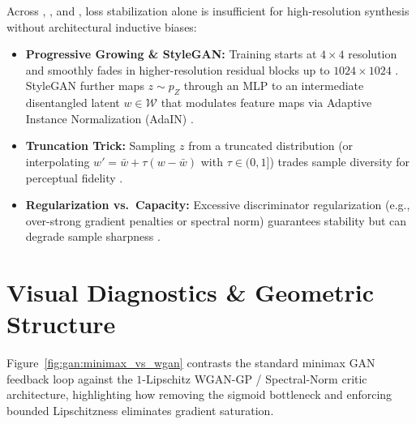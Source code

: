 \documentclass[../../../../master.tex]{subfiles}
\begin{document}
\begin{crossbook}
Across , , and , loss stabilization alone is insufficient for high-resolution synthesis without architectural inductive biases:
\begin{itemize}
  \item \textbf{Progressive Growing \& StyleGAN:} Training starts at $4\times 4$ resolution and smoothly fades in higher-resolution residual blocks up to $1024\times 1024$ . StyleGAN further maps $z \sim p_Z$ through an MLP to an intermediate disentangled latent $w \in \mathcal{W}$ that modulates feature maps via Adaptive Instance Normalization (AdaIN) .
  \item \textbf{Truncation Trick:} Sampling $z$ from a truncated distribution (or interpolating $w' = \bar{w} + \tau(w - \bar{w})$ with $\tau \in (0,1]$) trades sample diversity for perceptual fidelity .
  \item \textbf{Regularization vs.\ Capacity:} Excessive discriminator regularization (e.g., over-strong gradient penalties or spectral norm) guarantees stability but can degrade sample sharpness .
\end{itemize}
\end{crossbook}

\section{Visual Diagnostics \& Geometric Structure}
\label{sec:gan:visuals}

Figure~\ref{fig:gan:minimax_vs_wgan} contrasts the standard minimax GAN feedback loop against the $1$-Lipschitz WGAN-GP / Spectral-Norm critic architecture, highlighting how removing the sigmoid bottleneck and enforcing bounded Lipschitzness eliminates gradient saturation.
\end{document}
